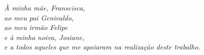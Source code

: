 \begin{dedicatoria}
   \vspace*{\fill}
   \centering
   \noindent
   \textit{À minha mãe, Franscisca,\\
   ao meu pai Genivaldo,\\
   ao meu irmão Felipe\\
   e à minha noiva, Josiane,\\ 
   e a todos aqueles que me apoiaram na realização deste trabalho.}\vspace*{\fill}
\end{dedicatoria}
